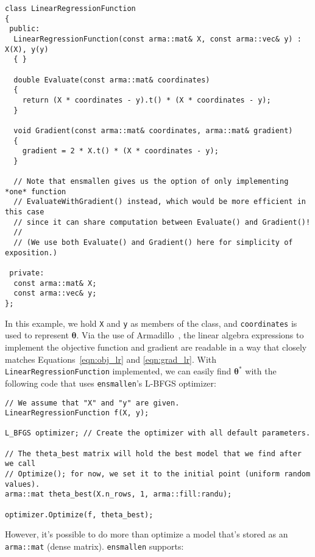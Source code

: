 \begin{verbatim}
class LinearRegressionFunction
{
 public:
  LinearRegressionFunction(const arma::mat& X, const arma::vec& y) : X(X), y(y)
  { }

  double Evaluate(const arma::mat& coordinates)
  {
    return (X * coordinates - y).t() * (X * coordinates - y);
  }

  void Gradient(const arma::mat& coordinates, arma::mat& gradient)
  {
    gradient = 2 * X.t() * (X * coordinates - y);
  }

  // Note that ensmallen gives us the option of only implementing *one* function
  // EvaluateWithGradient() instead, which would be more efficient in this case
  // since it can share computation between Evaluate() and Gradient()!
  //
  // (We use both Evaluate() and Gradient() here for simplicity of exposition.)

 private:
  const arma::mat& X;
  const arma::vec& y;
};
\end{verbatim}

In this example, we hold {\tt \small X} and {\tt \small y} as members of the
class, and {\tt \small coordinates} is used to represent $\bm \theta$.  Via the
use of Armadillo~\cite{TODO}, the linear algebra expressions to implement the
objective function and gradient are readable in a way that closely matches
Equations~\ref{eqn:obj_lr} and \ref{eqn:grad_lr}.  With {\tt \small
LinearRegressionFunction} implemented, we can easily find $\bm \theta^*$ with
the following code that uses {\tt ensmallen}'s L-BFGS optimizer:

\begin{verbatim}
// We assume that "X" and "y" are given.
LinearRegressionFunction f(X, y);

L_BFGS optimizer; // Create the optimizer with all default parameters.

// The theta_best matrix will hold the best model that we find after we call
// Optimize(); for now, we set it to the initial point (uniform random values).
arma::mat theta_best(X.n_rows, 1, arma::fill:randu);

optimizer.Optimize(f, theta_best);
\end{verbatim}

However, it's possible to do more than optimize a model that's stored as an {\tt
\small arma::mat} (dense matrix).  {\tt ensmallen} supports:

